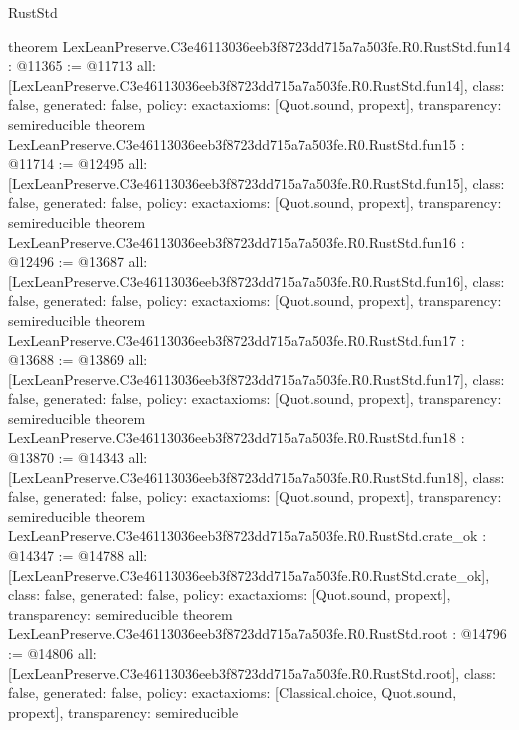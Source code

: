 \begin{lexlean}{RustStd}
\begin{coremodule}
{}
theorem LexLeanPreserve.C3e46113036eeb3f8723dd715a7a503fe.R0.RustStd.fun14 : @11365 := @11713 {
  all: [LexLeanPreserve.C3e46113036eeb3f8723dd715a7a503fe.R0.RustStd.fun14],
  class: false,
  generated: false,
  policy: exact{axioms: [Quot.sound, propext]},
  transparency: semireducible
}
theorem LexLeanPreserve.C3e46113036eeb3f8723dd715a7a503fe.R0.RustStd.fun15 : @11714 := @12495 {
  all: [LexLeanPreserve.C3e46113036eeb3f8723dd715a7a503fe.R0.RustStd.fun15],
  class: false,
  generated: false,
  policy: exact{axioms: [Quot.sound, propext]},
  transparency: semireducible
}
theorem LexLeanPreserve.C3e46113036eeb3f8723dd715a7a503fe.R0.RustStd.fun16 : @12496 := @13687 {
  all: [LexLeanPreserve.C3e46113036eeb3f8723dd715a7a503fe.R0.RustStd.fun16],
  class: false,
  generated: false,
  policy: exact{axioms: [Quot.sound, propext]},
  transparency: semireducible
}
theorem LexLeanPreserve.C3e46113036eeb3f8723dd715a7a503fe.R0.RustStd.fun17 : @13688 := @13869 {
  all: [LexLeanPreserve.C3e46113036eeb3f8723dd715a7a503fe.R0.RustStd.fun17],
  class: false,
  generated: false,
  policy: exact{axioms: [Quot.sound, propext]},
  transparency: semireducible
}
theorem LexLeanPreserve.C3e46113036eeb3f8723dd715a7a503fe.R0.RustStd.fun18 : @13870 := @14343 {
  all: [LexLeanPreserve.C3e46113036eeb3f8723dd715a7a503fe.R0.RustStd.fun18],
  class: false,
  generated: false,
  policy: exact{axioms: [Quot.sound, propext]},
  transparency: semireducible
}
theorem LexLeanPreserve.C3e46113036eeb3f8723dd715a7a503fe.R0.RustStd.crate_ok : @14347 := @14788 {
  all: [LexLeanPreserve.C3e46113036eeb3f8723dd715a7a503fe.R0.RustStd.crate_ok],
  class: false,
  generated: false,
  policy: exact{axioms: [Quot.sound, propext]},
  transparency: semireducible
}
theorem LexLeanPreserve.C3e46113036eeb3f8723dd715a7a503fe.R0.RustStd.root : @14796 := @14806 {
  all: [LexLeanPreserve.C3e46113036eeb3f8723dd715a7a503fe.R0.RustStd.root],
  class: false,
  generated: false,
  policy: exact{axioms: [Classical.choice, Quot.sound, propext]},
  transparency: semireducible
}


\end{coremodule}
\end{lexlean}
